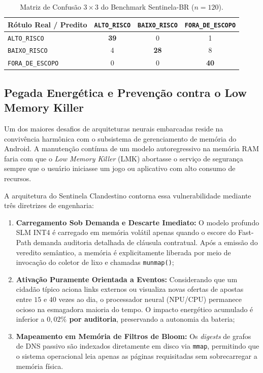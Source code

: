 \begin{table}[!htbp]
\centering
\caption{Matriz de Confus\~{a}o $3 \times 3$ do Benchmark Sentinela-BR ($n=120$).}
\label{tab:matriz_confusao}
\setlength{\tabcolsep}{8pt}
\scriptsize
\begin{tabular}{lccc}
\toprule
\textbf{R\'{o}tulo Real / Predito} & \textbf{\texttt{ALTO\_RISCO}} & \textbf{\texttt{BAIXO\_RISCO}} & \textbf{\texttt{FORA\_DE\_ESCOPO}} \\
\midrule
\texttt{ALTO\_RISCO} & \textbf{39} & 0 & 1 \\
\texttt{BAIXO\_RISCO} & 4 & \textbf{28} & 8 \\
\texttt{FORA\_DE\_ESCOPO} & 0 & 0 & \textbf{40} \\
\bottomrule
\end{tabular}
\end{table}

\subsection{Pegada Energ\'{e}tica e Preven\c{c}\~{a}o contra o Low Memory Killer}

Um dos maiores desafios de arquiteturas neurais embarcadas reside na conviv\^{e}ncia harm\^{o}nica com o subsistema de gerenciamento de mem\'{o}ria do Android. A manuten\c{c}\~{a}o cont\'{i}nua de um modelo autoregressivo na mem\'{o}ria RAM faria com que o \textit{Low Memory Killer} (LMK) abortasse o servi\c{c}o de seguran\c{c}a sempre que o usu\'{a}rio iniciasse um jogo ou aplicativo com alto consumo de recursos.

A arquitetura do Sentinela Clandestino contorna essa vulnerabilidade mediante tr\^{e}s diretrizes de engenharia:
\begin{enumerate}
    \item \textbf{Carregamento Sob Demanda e Descarte Imediato:} O modelo profundo SLM INT4 \'{e} carregado em mem\'{o}ria vol\'{a}til apenas quando o escore do Fast-Path demanda auditoria detalhada de cl\'{a}usula contratual. Ap\'{o}s a emiss\~{a}o do veredito sem\^{a}ntico, a mem\'{o}ria \'{e} explicitamente liberada por meio de invoca\c{c}\~{a}o do coletor de lixo e chamadas \texttt{munmap()};
    \item \textbf{Ativa\c{c}\~{a}o Puramente Orientada a Eventos:} Considerando que um cidad\~{a}o t\'{i}pico aciona links externos ou visualiza novas ofertas de apostas entre $15$ e $40$ vezes ao dia, o processador neural (NPU/CPU) permanece ocioso na esmagadora maioria do tempo. O impacto energ\'{e}tico acumulado \'{e} inferior a \textbf{$0{,}02\%$ por auditoria}, preservando a autonomia da bateria;
    \item \textbf{Mapeamento em Mem\'{o}ria de Filtros de Bloom:} Os \textit{digests} de grafos de DNS passivo s\~{a}o indexados diretamente em disco via \texttt{mmap}, permitindo que o sistema operacional leia apenas as p\'{a}ginas requisitadas sem sobrecarregar a mem\'{o}ria f\'{i}sica.
\end{enumerate}

